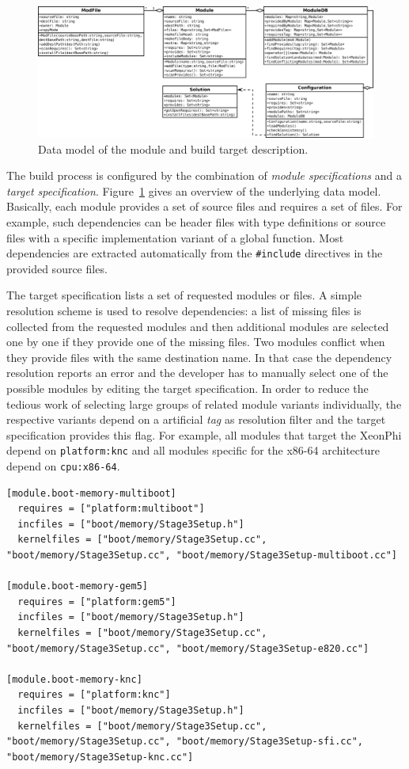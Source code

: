 \begin{figure}
  \centering
  \includegraphics[scale=0.25]{fig/mcconf.pdf}
  \caption{Data model of the module and build target description.}
  \label{fig:mcconf-model}
\end{figure}

The build process is configured by the combination of \emph{module specifications} and a \emph{target specification}. Figure~\ref{fig:mcconf-model} gives an overview of the underlying data model. Basically, each module provides a set of source files and requires a set of files. For example, such dependencies can be header files with type definitions or source files with a specific implementation variant of a global function. Most dependencies are extracted automatically from the \texttt{\#include} directives in the provided source files. 

The target specification lists a set of requested modules or files. A simple resolution scheme is used to resolve dependencies: a list of missing files is collected from the requested modules and then additional modules are selected one by one if they provide one of the missing files. Two modules conflict when they provide files with the same destination name. In that case the dependency resolution reports an error and the developer has to manually select one of the possible modules by editing the target specification. In order to reduce the tedious work of selecting large groups of related module variants individually, the respective variants depend on a artificial \emph{tag} as resolution filter and the target specification provides this flag. For example, all modules that target the XeonPhi depend on \texttt{platform:knc} and all modules specific for the x86-64 architecture depend on \texttt{cpu:x86-64}.

\begin{lstlisting}[float, label=lst:module, caption=An example module specification.]
[module.boot-memory-multiboot]
  requires = ["platform:multiboot"]
  incfiles = ["boot/memory/Stage3Setup.h"]
  kernelfiles = ["boot/memory/Stage3Setup.cc", "boot/memory/Stage3Setup.cc", "boot/memory/Stage3Setup-multiboot.cc"]

[module.boot-memory-gem5]
  requires = ["platform:gem5"]
  incfiles = ["boot/memory/Stage3Setup.h"]
  kernelfiles = ["boot/memory/Stage3Setup.cc", "boot/memory/Stage3Setup.cc", "boot/memory/Stage3Setup-e820.cc"]

[module.boot-memory-knc]
  requires = ["platform:knc"]
  incfiles = ["boot/memory/Stage3Setup.h"]
  kernelfiles = ["boot/memory/Stage3Setup.cc", "boot/memory/Stage3Setup.cc", "boot/memory/Stage3Setup-sfi.cc", "boot/memory/Stage3Setup-knc.cc"]
\end{lstlisting}

